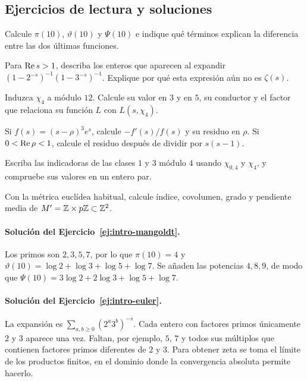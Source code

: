 \subsection{Ejercicios de lectura y soluciones}

\begin{ejercicio}\label{ej:intro-mangoldt}
Calcule $\pi(10)$, $\vartheta(10)$ y $\Psi(10)$ e indique qué términos
explican la diferencia entre las dos últimas funciones.
\end{ejercicio}
\begin{ejercicio}\label{ej:intro-euler}
Para $\operatorname{Re} s>1$, describa los enteros que aparecen al expandir
$(1-2^{-s})^{-1}(1-3^{-s})^{-1}$. Explique por qué esta expresión aún
no es $\zeta(s)$.
\end{ejercicio}
\begin{ejercicio}\label{ej:intro-conductor}
Induzca $\chi_4$ a módulo $12$. Calcule su valor en $3$ y en $5$, su
conductor y el factor que relaciona su función $L$ con $L(s,\chi_4)$.
\end{ejercicio}
\begin{ejercicio}\label{ej:intro-polo}
Si $f(s)=(s-\rho)^3e^s$, calcule $-f'(s)/f(s)$ y su residuo en $\rho$.
Si $0<\operatorname{Re}\rho<1$, calcule el residuo después de dividir por $s(s-1)$.
\end{ejercicio}
\begin{ejercicio}\label{ej:intro-ortogonalidad}
Escriba las indicadoras de las clases $1$ y $3$ módulo $4$ usando
$\chi_{0,4}$ y $\chi_4$, y compruebe sus valores en un entero par.
\end{ejercicio}
\begin{ejercicio}\label{ej:intro-reticulo}
Con la métrica euclídea habitual, calcule índice, covolumen, grado y
pendiente media de $M'=\mathbb{Z}\times p\mathbb{Z}\subset\mathbb{Z}^2$.
\end{ejercicio}

\paragraph{Solución del Ejercicio~\ref{ej:intro-mangoldt}.}
Los primos son $2,3,5,7$, por lo que $\pi(10)=4$ y
$\vartheta(10)=\log2+\log3+\log5+\log7$.
Se añaden las potencias $4,8,9$, de modo que
$\Psi(10)=3\log2+2\log3+\log5+\log7$.

\paragraph{Solución del Ejercicio~\ref{ej:intro-euler}.}
La expansión es $\sum_{a,b\ge0}(2^a3^b)^{-s}$. Cada entero con factores
primos únicamente $2$ y $3$ aparece una vez. Faltan, por ejemplo, $5$, $7$
y todos sus múltiplos que contienen factores primos diferentes de $2$ y
$3$. Para obtener zeta se toma el límite de los productos finitos, en
el dominio donde la convergencia absoluta permite hacerlo.

